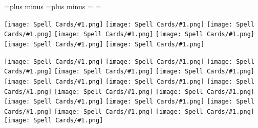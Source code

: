 \documentclass{article}
\newcommand\card[1]{{\texttt{[image: Spell Cards/\#1.png]}}}
\renewcommand\card[1]{{\texttt{[image: Spell Cards/\#1.png]}}}
\renewcommand\card[1]{{\texttt{[image: Spell Cards/\#1.png]}}}
\newcommand\nospaces{%
  \spaceskip=\myspace plus \myspace minus \myspace
  \xspaceskip=\myspace plus \myspace minus \myspace
  \baselineskip=\myspace
  \lineskip=\myspace
}
\begin{document}
\raggedright







\nospaces

\card{Druidcraft}
\card{Mending}
\card{Poison Spray}
\card{Produce Flame}
\card{Resistance}
\card{Shillelagh}
\card{Thorn Whip}

\vspace*{1in}

\card{Animal Friendship}
\card{Charm Person}
\card{Create or Destroy Water}
\card{Cure Wounds}
\card{Detect Magic}
\card{Detect Poison and Disease}
\card{Entangle}
\card{Faerie Fire}
\card{Fog Cloud}
\card{Goodberry}
\card{Healing Word}
\card{Jump}
\card{Longstrider}
\card{Purify Food and Drink}
\card{Speak with Animals}
\card{Thunderwave}








\end{document}

